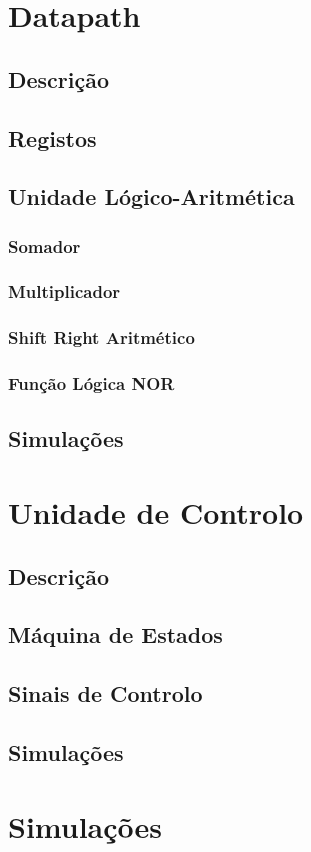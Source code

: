 \documentclass[a4paper]{article}
\begin{document}


\tableofcontents
\pagebreak

\section{Datapath}
\subsection{Descrição}
\subsection{Registos}
\subsection{Unidade Lógico-Aritmética}
\subsubsection{Somador}
\subsubsection{Multiplicador}
\subsubsection{Shift Right Aritmético}
\subsubsection{Função Lógica NOR}
\subsection{Simulações}


\section{Unidade de Controlo}
\subsection{Descrição}
\subsection{Máquina de Estados}
\subsection{Sinais de Controlo}
\subsection{Simulações}


\section{Simulações}
\end{document}
